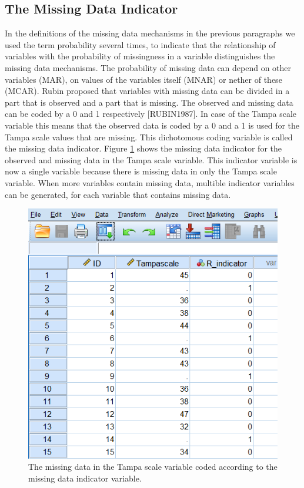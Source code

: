 \documentclass[]{book}
\begin{document}
\subsection{The Missing Data
Indicator}\label{the-missing-data-indicator}

In the definitions of the missing data mechanisms in the previous
paragraphs we used the term probability several times, to indicate that
the relationship of variables with the probability of missingness in a
variable distinguishes the missing data mechanisms. The probability of
missing data can depend on other variables (MAR), on values of the
variables itself (MNAR) or nether of these (MCAR). Rubin proposed that
variables with missing data can be divided in a part that is observed
and a part that is missing. The observed and missing data can be coded
by a 0 and 1 respectively {[}RUBIN1987{]}. In case of the Tampa scale
variable this means that the observed data is coded by a 0 and a 1 is
used for the Tampa scale values that are missing. This dichotomous
coding variable is called the missing data indicator. Figure
\ref{fig:fig2-8} shows the missing data indicator for the observed and
missing data in the Tampa scale variable. This indicator variable is now
a single variable because there is missing data in only the Tampa scale
variable. When more variables contain missing data, multible indicator
variables can be generated, for each variable that contains missing
data.

\begin{figure}

{\centering \includegraphics[width=0.9\linewidth]{images/fig2.8} 

}

\caption{The missing data in the Tampa scale variable coded according to the missing data indicator variable.}\label{fig:fig2-8}
\end{figure}
\end{document}
